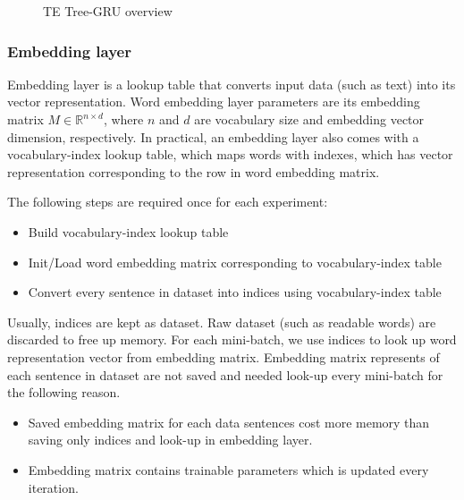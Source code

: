\begin{figure}[H]
    \centering
    \caption[TE Tree-GRU overview]{TE Tree-GRU overview}
    \label{fig:vtgrusummary}
\end{figure}

\subsubsection{Embedding layer}\label{sec:embedding}
Embedding layer is a lookup table that converts input data (such as text) into its vector representation. Word embedding layer parameters are its embedding matrix $M  \in \mathbb{R}^{n \times d}$, where $n$ and $d$ are vocabulary size and embedding vector dimension, respectively. In practical, an embedding layer also comes with a vocabulary-index lookup table, which maps words with indexes, which has vector representation corresponding to the row in word embedding matrix.

The following steps are required once for each experiment:
\begin{itemize}
    \item Build vocabulary-index lookup table
    \item Init/Load word embedding matrix corresponding to vocabulary-index table
    \item Convert every sentence in dataset into indices using vocabulary-index table
\end{itemize}
Usually, indices are kept as dataset. Raw dataset (such as readable words) are discarded to free up memory. For each mini-batch, we use indices to look up word representation vector from embedding matrix. Embedding matrix represents of each sentence in dataset are not saved and needed look-up every mini-batch for the following reason.
\begin{itemize}
    \item Saved embedding matrix for each data sentences cost more memory than saving only indices and look-up in embedding layer.
    \item Embedding matrix contains trainable parameters which is updated every iteration.
\end{itemize}

